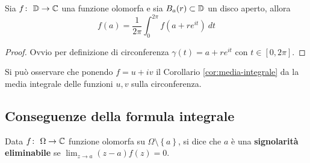 \begin{corollary}
    Sia $f \colon\ \mathbb{D} \rightarrow \mathbb{C}$ una funzione olomorfa e sia $B_a(r) \subset
    \mathbb{D}$ un disco aperto, allora
    \begin{equation*}
        f(a) = \frac{1}{2\pi} \int_0^{2\pi} f(a + re^{it}) \ dt 
    \end{equation*}
    \label{cor:media-integrale}
\end{corollary}
\begin{proof}
  Ovvio per definizione di circonferenza $\gamma(t) = a + re^{it}$ con $t \in
    \left[ 0, 2\pi \right]$. 
\end{proof}
\begin{remark}
    Si può osservare che ponendo $f = u + iv$ il Corollario
    \ref{cor:media-integrale} da la media integrale delle funzioni $u, v$
    sulla circonferenza.
\end{remark}

\subsection{\textcolor{AnComp}{\textbf{Conseguenze della formula integrale}}}

\begin{definition}
  Data $f \colon\ \Omega \rightarrow \mathbb{C}$ funzione olomorfa su $\Omega \setminus
  \left\{ a \right\}$, si dice che $a$ è una \textbf{signolarità
  eliminabile} se $\lim_{z\to a} (z-a) f(z) = 0$.
\end{definition}

